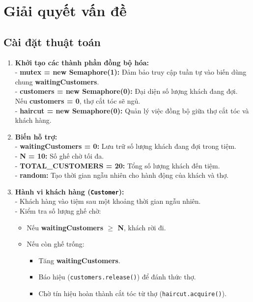 \section{Giải quyết vấn đề}

\subsection{Cài đặt thuật toán}
\begin{enumerate}
    \item \textbf{Khởi tạo các thành phần đồng bộ hóa:}\\
    - \textbf{mutex = new Semaphore(1):} Đảm bảo truy cập tuần tự vào biến dùng chung \textbf{waitingCustomers}.\\
    - \textbf{customers = new Semaphore(0):} Đại diện số lượng khách đang đợi. Nếu \textbf{customers = 0}, thợ cắt tóc sẽ ngủ.\\
    - \textbf{haircut = new Semaphore(0):} Quản lý việc đồng bộ giữa thợ cắt tóc và khách hàng.
    
    \item \textbf{Biến hỗ trợ:}\\
    - \textbf{waitingCustomers = 0:} Lưu trữ số lượng khách đang đợi trong tiệm.\\
    - \textbf{N = 10:} Số ghế chờ tối đa.\\
    - \textbf{TOTAL\_CUSTOMERS = 20:} Tổng số lượng khách đến tiệm.\\
    - \textbf{random:} Tạo thời gian ngẫu nhiên cho hành động của khách và thợ.

    \item \textbf{Hành vi khách hàng (\texttt{Customer}):}\\
    - Khách hàng vào tiệm sau một khoảng thời gian ngẫu nhiên.\\
    - Kiểm tra số lượng ghế chờ:
    \begin{itemize}
        \item Nếu \textbf{waitingCustomers $\geq$ N}, khách rời đi.
        \item Nếu còn ghế trống:
        \begin{itemize}
            \item Tăng \textbf{waitingCustomers}.
            \item Báo hiệu (\texttt{customers.release()}) để đánh thức thợ.
            \item Chờ tín hiệu hoàn thành cắt tóc từ thợ (\texttt{haircut.acquire()}).
        \end{itemize}
    \end{itemize}


\end{enumerate}
